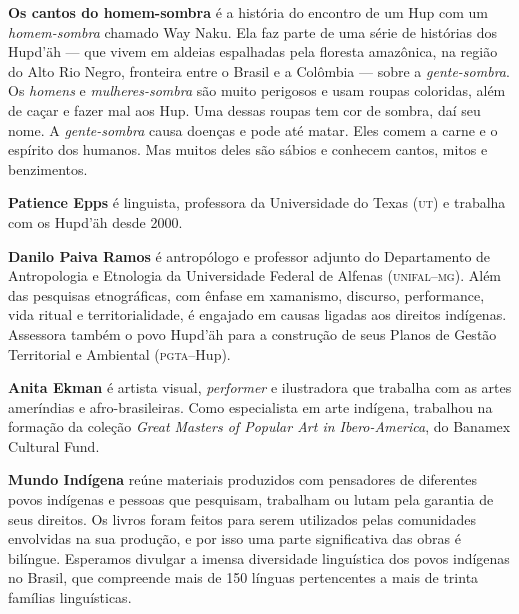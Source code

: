 \textbf{Os cantos do homem-sombra} é a história do encontro de um Hup com um \textit{homem-sombra} chamado Way Naku. Ela faz parte de uma série de histórias dos Hupd'äh --- que vivem em aldeias espalhadas pela floresta amazônica, na região do Alto Rio Negro, fronteira entre o Brasil e a Colômbia --- sobre a \textit{gente-sombra}. Os \textit{homens} e \textit{mulheres-sombra} são muito perigosos e usam roupas coloridas, além de caçar e fazer mal aos Hup. Uma dessas roupas tem cor de sombra, daí seu nome. A \textit{gente-sombra} causa doenças e pode até matar. Eles comem a carne e o espírito dos humanos. Mas muitos deles são sábios e conhecem cantos, mitos e benzimentos. 

\textbf{Patience Epps} ​é linguista, professora da Universidade do Texas \textsc{(ut)} e trabalha com os Hupd'äh desde 2000.

\textbf{Danilo Paiva Ramos} é antropólogo e professor adjunto do Departamento de Antropologia e Etnologia da Universidade Federal de Alfenas (\textsc{unifal--mg}). Além das pesquisas etnográficas, com ênfase em xamanismo, discurso, performance, vida ritual e territorialidade, é engajado em causas ligadas aos direitos indígenas. Assessora também o povo Hupd'äh para a construção de seus Planos de Gestão Territorial e Ambiental (\textsc{pgta}--Hup).

\textbf{Anita Ekman} é artista visual, \textit{performer} e ilustradora que trabalha com as artes ameríndias e afro-brasileiras. Como especialista em arte indígena, trabalhou na formação da coleção \textit{Great Masters of Popular Art in Ibero-America}, do Banamex Cultural Fund.

\textbf{Mundo Indígena} reúne materiais produzidos com pensadores de diferentes povos indígenas e pessoas que pesquisam, trabalham ou lutam pela garantia de seus direitos. Os livros foram feitos para serem utilizados pelas comunidades envolvidas na sua produção, e por isso uma parte significativa das obras é bilíngue. Esperamos divulgar a imensa diversidade linguística dos povos indígenas no Brasil, que compreende mais de 150 línguas pertencentes a mais de trinta famílias linguísticas.

